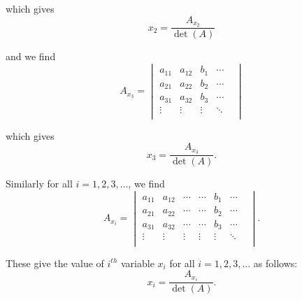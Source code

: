 which gives
\[
x_2 = \frac{ A_{x_2}}{\operatorname{det } (A)}
\]

and we find
\[
    A_{x_3} = \begin{vmatrix}
    a_{11} & a_{12} & b_1 & \cdots &  \\
    a_{21} & a_{22} & b_2 & \cdots &  \\
    a_{31} & a_{32} & b_3 & \cdots &  \\
    \vdots & \vdots & \vdots & \ddots &  \\
\end{vmatrix}
\]

which gives 
\[
x_3 = \frac{ A_{x_3}}{\operatorname{det } (A)}.
\]

Similarly for all $i=1, 2, 3, \ldots$, we find
\[
      A_{x_i} = \begin{vmatrix}
    a_{11} & a_{12} & \cdots & \cdots & b_1 & \cdots &  \\
    a_{21} & a_{22} & \cdots & \cdots & b_2 & \cdots &  \\
    a_{31} & a_{32} & \cdots & \cdots & b_3 & \cdots &  \\
    \vdots & \vdots & \vdots & \vdots & \vdots & \ddots & \\
\end{vmatrix}.
\]

These give the value of $i^{th}$ variable $x_i$ for all $i=1, 2, 3, \ldots$ as follows:
\[
x_i = \frac{ A_{x_i}}{\operatorname{det } (A)}.
\]
